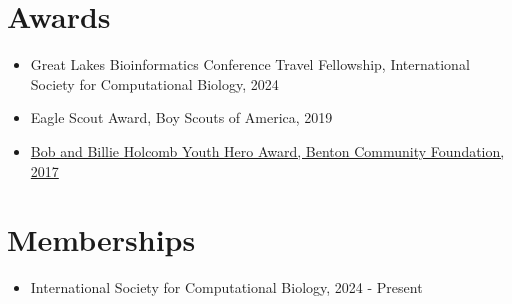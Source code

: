 \documentclass{article}
\begin{document}
\begin{flushleft}
\section*{Awards}
\begin{itemize}
\item Great Lakes Bioinformatics Conference Travel Fellowship, International Society for Computational Biology, 2024
\item Eagle Scout Award, Boy Scouts of America, 2019
\item \href{https://gazettetimes.com/news/local/boy-scouts-who-helped-troop-leader-to-safety-win-youth-hero-award/article_bf6fda77-1873-59c3-880e-4f05c45d1ef5.html}{Bob and Billie Holcomb Youth Hero Award, Benton Community Foundation, 2017}
\end{itemize}

\section*{Memberships}
\begin{itemize}
\item International Society for Computational Biology, 2024 - Present
\end{itemize}

\end{flushleft}
\end{document}
